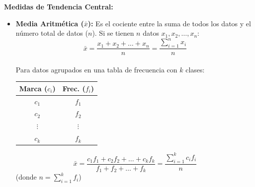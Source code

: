 \documentclass[12pt, letterpaper]{article}
\begin{document}
\textbf{Medidas de Tendencia Central:}
\begin{itemize}
    \item \textbf{Media Aritmética ($\bar{x}$):} Es el cociente entre la suma de todos los datos y el número total de datos ($n$). Si se tienen $n$ datos $x_1, x_2, \dots, x_n$:
        \[ \bar{x}=\frac{x_1+x_2+\dots+x_n}{n} = \frac{\sum_{i=1}^{n} x_i}{n} \] \\
    Para datos agrupados en una tabla de frecuencia con $k$ clases:
    \begin{center}
        \begin{minipage}{0.35\textwidth}
            \centering
            \begin{tabularx}{\linewidth}{|c|c|} 
                \hline
                \textbf{Marca ($c_i$)} & \textbf{Frec. ($f_i$)} \\
                \hline
                $c_1$ & $f_1$ \\
                \hline
                $c_2$ & $f_2$ \\
                \hline
                $\vdots$ & $\vdots$ \\
                \hline
                $c_k$ & $f_k$ \\
                \hline
             \end{tabularx}
        \end{minipage}
        \hfill
        \begin{minipage}{0.55\textwidth}
            \centering
            \[ \bar{x}=\frac{c_1 f_1 + c_2 f_2 + \dots + c_k f_k}{f_1+f_2+\dots+f_k} = \frac{\sum_{i=1}^{k} c_i f_i}{n} \]
            (donde $n = \sum_{i=1}^{k} f_i$)
        \end{minipage}
    \end{center}


\end{itemize}
\end{document}
